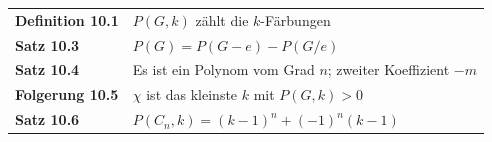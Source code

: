 \begin{merksatz}
\begin{center}
\renewcommand{\arraystretch}{1.5}
\begin{tabular}{@{}P{3.0cm}P{5.6cm}@{}}
\toprule
\textbf{Definition 10.1} & $P(G,k)$ zählt die $k$-Färbungen\\
\textbf{Satz 10.3} & $P(G) = P(G-e) - P(G/e)$\\
\textbf{Satz 10.4} & Es ist ein Polynom vom Grad $n$; zweiter Koeffizient $-m$\\
\textbf{Folgerung 10.5} & $\chi$ ist das kleinste $k$ mit $P(G,k) > 0$\\
\textbf{Satz 10.6} & $P(C_n,k) = (k-1)^n + (-1)^n(k-1)$\\
\bottomrule
\end{tabular}
\end{center}

\begin{center}
\begin{minipage}{0.88\textwidth}
\end{minipage}
\end{center}
\end{merksatz}
